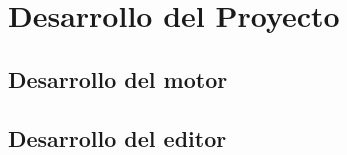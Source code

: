 \chapter{Desarrollo del Proyecto}
\label{cap:desarrollo}

\section{Desarrollo del motor}

\section{Desarrollo del editor}
